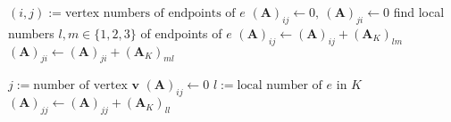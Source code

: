 \begin{algorithmic}[1]
		\State $(i,j):=\textrm{vertex numbers of endpoints of } e$
		\State $(\mathbf{A})_{ij}\gets 0,\ (\mathbf{A})_{ji}\gets 0$
			\State find local numbers $l,m\in\{1,2,3\}$ of endpoints of $e$
			\State $(\mathbf{A})_{ij}\gets(\mathbf{A})_{ij}+
				(\mathbf{A}_K)_{lm}$ 
			\State $(\mathbf{A})_{ji}\gets(\mathbf{A})_{ji}+
				(\mathbf{A}_K)_{ml}$ 		
		\EndFor	
	\EndFor
	
		\State $j:=\textrm{number of vertex }\bm{v}$
		\State $(\mathbf{A})_{ij}\gets 0$
		\State $l:=\textrm{local number of } e \textrm{ in } K $
			\State $(\mathbf{A})_{jj}\gets(\mathbf{A})_{jj}+
				(\mathbf{A}_K)_{ll}$ 
		\EndFor
	\EndFor
\end{algorithmic}
